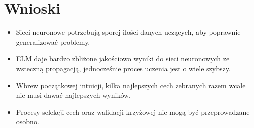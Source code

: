 \chapter{Wnioski}
\begin{itemize}
	\item{Sieci neuronowe potrzebują sporej ilości danych uczących, aby poprawnie generalizować problemy.}
	\item{ELM daje bardzo zbliżone jakościowo wyniki do sieci neuronowych ze wsteczną propagacją, jednocześnie proces uczenia jest o wiele szybszy.}
	\item{Wbrew początkowej intuicji, kilka najlepszych cech zebranych razem wcale nie musi dawać najlepszych wyników.}
	\item{Procesy selekcji cech oraz walidacji krzyżowej nie mogą być przeprowadzane osobno.}
\end{itemize}